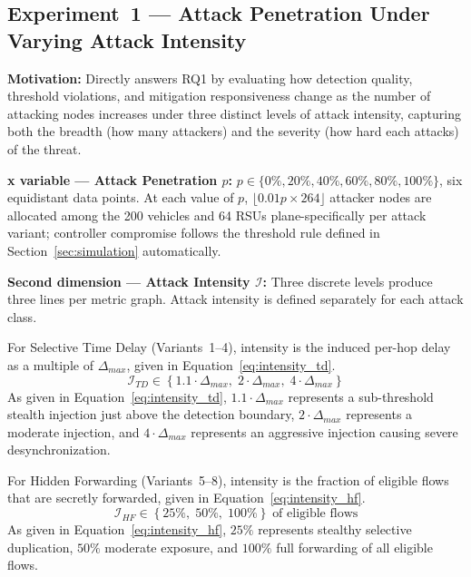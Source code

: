 \documentclass[12pt, a4paper]{report}
\begin{document}
{{%

\subsection{Experiment~1 — Attack Penetration Under
Varying Attack Intensity}
\label{sec:exp1}

\textbf{Motivation:} Directly answers RQ1 by evaluating
how detection quality, threshold violations, and
mitigation responsiveness change as the number of
attacking nodes increases under three distinct levels
of attack intensity, capturing both the breadth
(how many attackers) and the severity (how hard each
attacks) of the threat.

\textbf{x variable — Attack Penetration $p$:}
$p \in \{0\%, 20\%, 40\%, 60\%, 80\%, 100\%\}$,
six equidistant data points. At each value of $p$,
$\lfloor 0.01p \times 264 \rfloor$ attacker nodes are
allocated among the 200 vehicles and 64 \ac{RSU}s
plane-specifically per attack variant; controller
compromise follows the threshold rule defined in
Section~\ref{sec:simulation} automatically.

\textbf{Second dimension — Attack Intensity $\mathcal{I}$:}
Three discrete levels produce three lines per metric
graph. Attack intensity is defined separately for each
attack class.

For Selective Time Delay (Variants~1--4), intensity is
the induced per-hop delay as a multiple of $\Delta_{max}$,
given in Equation~\eqref{eq:intensity_td}.
\begin{equation}
\mathcal{I}_{TD} \in
\left\{
1.1\cdot\Delta_{max},\;
2\cdot\Delta_{max},\;
4\cdot\Delta_{max}
\right\}
\label{eq:intensity_td}
\end{equation}
As given in Equation~\eqref{eq:intensity_td},
$1.1\cdot\Delta_{max}$ represents a sub-threshold
stealth injection just above the detection boundary,
$2\cdot\Delta_{max}$ represents a moderate injection,
and $4\cdot\Delta_{max}$ represents an aggressive
injection causing severe desynchronization.

For Hidden Forwarding (Variants~5--8), intensity is
the fraction of eligible flows that are secretly
forwarded, given in Equation~\eqref{eq:intensity_hf}.
\begin{equation}
\mathcal{I}_{HF} \in
\left\{25\%,\; 50\%,\; 100\%\right\}
\;\text{of eligible flows}
\label{eq:intensity_hf}
\end{equation}
As given in Equation~\eqref{eq:intensity_hf},
$25\%$ represents stealthy selective duplication,
$50\%$ moderate exposure, and $100\%$ full
forwarding of all eligible flows.

}}
\end{document}
